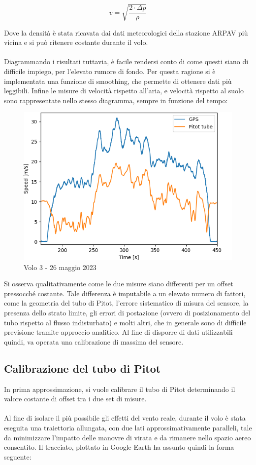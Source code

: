 \documentclass[12pt]{article}
\begin{document}
\begin{equation}
v = \sqrt{\frac{2 \cdot \Delta p}{\rho}}
\end{equation}

\noindent
Dove la densità è stata ricavata dai dati meteorologici della stazione ARPAV più vicina \cite{arpav} e si può ritenere costante durante il volo.
\\\\
Diagrammando i risultati tuttavia, è facile rendersi conto di come questi siano di difficile impiego, per l'elevato rumore di fondo. Per questa ragione si è implementata una funzione di smoothing, che permette di ottenere dati più leggibili. Infine le misure di velocità rispetto all'aria, e velocità rispetto al suolo sono rappresentate nello stesso diagramma, sempre in funzione del tempo:

\begin{figure}[H]
	\centering
	\includegraphics[width=12cm]{img/pitot-offset-3}
	\captionsetup{labelformat=empty}
	\caption{Volo 3 - 26 maggio 2023}
\end{figure}

\noindent
Si osserva qualitativamente come le due misure siano differenti per un offset pressocché costante. Tale differenza è imputabile a un elevato numero di fattori, come la geometria del tubo di Pitot, l'errore sistematico di misura del sensore, la presenza dello strato limite, gli errori di postazione (ovvero di posizionamento del tubo rispetto al flusso indisturbato) e molti altri, che in generale sono di difficile previsione tramite approccio analitico. Al fine di disporre di dati utilizzabili quindi, va operata una calibrazione di massima del sensore.

\subsection{Calibrazione del tubo di Pitot}
In prima approssimazione, si vuole calibrare il tubo di Pitot determinando il valore costante di offset tra i due set di misure.
\\\\
Al fine di isolare il più possibile gli effetti del vento reale, durante il volo è stata eseguita una traiettoria allungata, con due lati approssimativamente paralleli, tale da minimizzare l'impatto delle manovre di virata e da rimanere nello spazio aereo consentito. Il tracciato, plottato in Google Earth ha assunto quindi la forma seguente:
\end{document}
